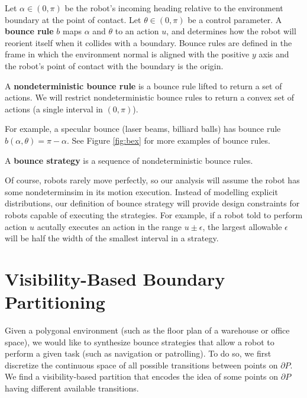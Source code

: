 \documentclass[]{styles/svproc}  %
\begin{document}
\begin{definition}
Let $\alpha \in (0,\pi)$ be the robot's incoming heading relative to the
environment boundary at the point of contact. Let $\theta \in (0,\pi)$ be a control parameter. A 
\textbf{bounce rule} $b$ maps $\alpha$ and $\theta$ to an action
$u$, and determines how the robot will reorient itself when it collides with a
boundary. Bounce rules are defined in the
frame in which the environment normal is aligned with the positive $y$ axis and the
robot's point of contact with the boundary is the origin.
\end{definition}
\begin{definition}
A \textbf{nondeterministic bounce rule} is a bounce rule lifted to return a set of actions. 
We will restrict nondeterministic bounce rules to
return a convex set of actions (a single interval in $(0, \pi)$).
\end{definition}

For example, a specular bounce (laser beams, billiard balls) has bounce rule 
$b(\alpha, \theta) = \pi - \alpha$. See Figure \ref{fig:bex} for more
examples of bounce rules. 

\begin{definition}
A \textbf{bounce strategy} is a sequence of nondeterministic bounce rules.
\end{definition}

Of course, robots rarely move perfectly, so our analysis will assume the
robot has some nondeterminsim in its motion execution.
Instead of modelling explicit
distributions, our definition of bounce strategy will provide design constraints
for robots capable of executing the strategies. For example, if a robot told to
perform action $u$ acutally executes
an action in the range $u \pm \epsilon$, the largest allowable $\epsilon$ will be half the
width of the smallest interval in a strategy.


\section{Visibility-Based Boundary Partitioning} \label{sec:partition}

Given a polygonal environment (such as the floor plan of a warehouse or office
space), we would like to synthesize bounce strategies that allow a robot to
perform a given task (such as navigation or patrolling).
To do so, we first discretize the continuous space of all possible
transitions between points on $\partial P$. We find a visibility-based partition
that encodes the idea of some points on $\partial P$ having different
available transitions.
\end{document}
